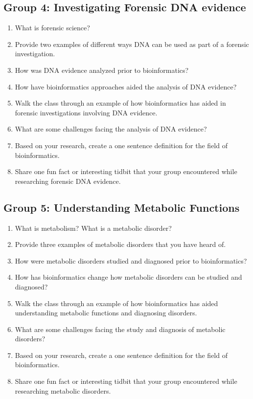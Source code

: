 \subsection*{Group 4: Investigating Forensic DNA evidence}
\begin{enumerate}
	\item What is forensic science?
	\item Provide two examples of different ways DNA can be used as part of a forensic investigation.
	\item How was DNA evidence analyzed prior to bioinformatics?
	\item How have bioinformatics approaches aided the analysis of DNA evidence?
	\item Walk the class through an example of how bioinformatics has aided in forensic investigations involving DNA evidence.
	\item What are some challenges facing  the analysis of DNA evidence?
	\item Based on your research, create a one sentence definition for the field of bioinformatics.
	\item Share one fun fact or interesting tidbit that your group encountered while researching forensic DNA evidence.
\end{enumerate}

\subsection*{Group 5: Understanding Metabolic Functions}
\begin{enumerate}
	\item What is metabolism?  What is a metabolic disorder?
	\item Provide three examples of metabolic disorders that you have heard of. 
	\item How were metabolic disorders studied and diagnosed prior to bioinformatics?
	\item How has bioinformatics change how metabolic disorders can be studied and diagnosed?
	\item Walk the class through an example of how bioinformatics has aided understanding metabolic functions and diagnosing disorders.
	\item What are some challenges facing the study and diagnosis of metabolic disorders?
	\item Based on your research, create a one sentence definition for the field of bioinformatics.
	\item Share one fun fact or interesting tidbit that your group encountered while researching metabolic disorders.
\end{enumerate}


